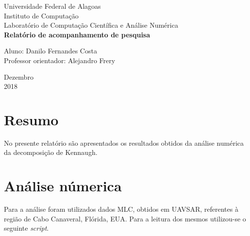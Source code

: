 \documentclass[12pt]{article}
\begin{document}

\onehalfspacing

\begin{titlepage}
	\begin{center}

		\Huge{Universidade Federal de Alagoas}\\
		\large{Instituto de Computação}\\ 
		\large{Laboratório de Computação Científica e Análise Numérica}\\ 
        \vspace{220pt}
        \textbf{\LARGE{Relatório de acompanhamento de pesquisa}}\\
		\vspace{3,5cm}
	\end{center}
	
	\begin{flushleft}
		\begin{tabbing}
			Aluno: Danilo Fernandes Costa\\
			Professor orientador: Alejandro Frery\\
	\end{tabbing}
 \end{flushleft}
	\vspace{1cm}
	
	\begin{center}
		\vspace{\fill}
			 Dezembro\\
		 2018
			\end{center}
\end{titlepage}

\section{Resumo}

No presente relatório são apresentados os resultados obtidos da análise numérica da decomposição de Kennaugh.

\section{Análise númerica}

Para a análise foram utilizados dados MLC, obtidos em UAVSAR, referentes à região de Cabo Canaveral, Flórida, EUA. Para a leitura dos mesmos utilizou-se o seguinte \textit{script}.
\end{document}
